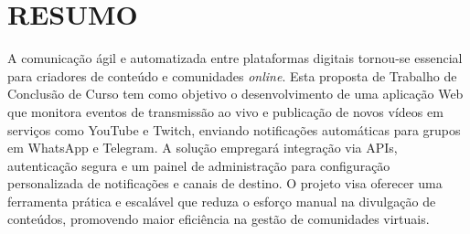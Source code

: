 \section{RESUMO}
\label{sec:resumo}
A comunicação ágil e automatizada entre plataformas digitais tornou-se essencial para criadores de conteúdo e comunidades \textit{online}. Esta proposta de Trabalho de Conclusão de Curso tem como objetivo o desenvolvimento de uma aplicação Web que monitora eventos de transmissão ao vivo e publicação de novos vídeos em serviços como YouTube e Twitch, enviando notificações automáticas para grupos em WhatsApp e Telegram. A solução empregará integração via APIs, autenticação segura e um painel de administração para configuração personalizada de notificações e canais de destino. O projeto visa oferecer uma ferramenta prática e escalável que reduza o esforço manual na divulgação de conteúdos, promovendo maior eficiência na gestão de comunidades virtuais.

